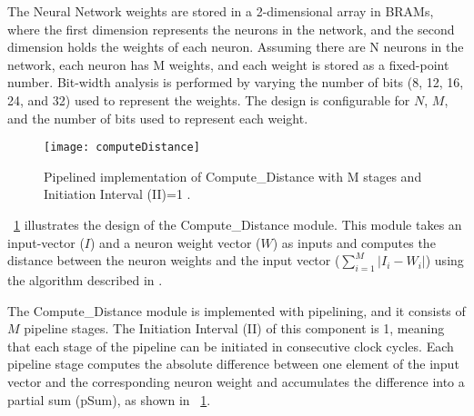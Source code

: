 The Neural Network weights are stored in a 2-dimensional array in BRAMs, where the first dimension represents the neurons in the network, and the second dimension holds the weights of each neuron. Assuming there are N neurons in the network, each neuron has M weights, and each weight is stored as a fixed-point number. Bit-width analysis is performed by varying the number of bits (8, 12, 16, 24, and 32) used to represent the weights. The design is configurable for $N$, $M$, and the number of bits used to represent each weight.
\begin{figure}[!htb]
	\centering
	\texttt{[image: computeDistance]}
	\caption{Pipelined implementation of Compute\_Distance with M stages and Initiation Interval (II)=1 .}
	\label{fig:ComputeDistance}
\end{figure}
\begin{comment}
\figurename{~\ref{fig:ComputeDistance}} shows the design of the Compute\_Distance module. This component takes an input-vector ($I$) and a neuron weight vector ($W$) as input and returns the distance between neuron weights and the input vector ($\sum_{i=1}^{M}|I_{i}-W_{i}|$) as described in Algorithm~\ref{alg:algorithm}. This component has a pipelined implementation with $M$ number of pipeline stages. The initiation Interval (II) of this component is 1. Each stage of the pipeline computes the absolute difference between one input element and the corresponding neuron weight and accumlates the difference into the partial sum (pSum) as shown in \figurename{~\ref{fig:ComputeDistance}}. The accumlated pSum is then passed as input to the next stage. The pSum to the first stage is set to zero. The pSum of the last stage is the distance between the input and neuron vectors.
\end{comment}

\figurename{~\ref{fig:ComputeDistance}} illustrates the design of the Compute\_Distance module. This module takes an input-vector ($I$) and a neuron weight vector ($W$) as inputs and computes the distance between the neuron weights and the input vector ($\sum_{i=1}^{M}|I_{i}-W_{i}|$) using the algorithm described in . 

The Compute\_Distance module is implemented with pipelining, and it consists of $M$ pipeline stages. The Initiation Interval (II) of this component is 1, meaning that each stage of the pipeline can be initiated in consecutive clock cycles. Each pipeline stage computes the absolute difference between one element of the input vector and the corresponding neuron weight and accumulates the difference into a partial sum (pSum), as shown in \figurename{~\ref{fig:ComputeDistance}}.


